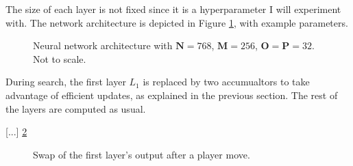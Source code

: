 The size of each layer is not fixed since it is a hyperparameter I will experiment with. The network architecture is depicted in Figure \ref{fig:network}, with example parameters.

\begin{figure}[H]
\centering
{}
\caption{Neural network architecture with $\bm{N}=768$, $\bm{M}=256$, $\bm{O}=\bm{P}=32$. Not to scale.}
\label{fig:network}
\end{figure}

During search, the first layer $L_1$ is replaced by two accumualtors to take advantage of efficient updates, as explained in the previous section. The rest of the layers are computed as usual.

[...] \ref{fig:incr_update}

\begin{figure}[H]
\centering
{}
\caption{Swap of the first layer's output after a player move.}
\label{fig:incr_update}
\end{figure}

